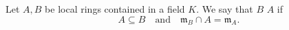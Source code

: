 Let $A, B$ be local rings contained in a field $K$. We say that $B$  $A$ if
$$A \subseteq B \quad \text{and} \quad \mathfrak{m}_B \cap A = \mathfrak{m}_A.$$
